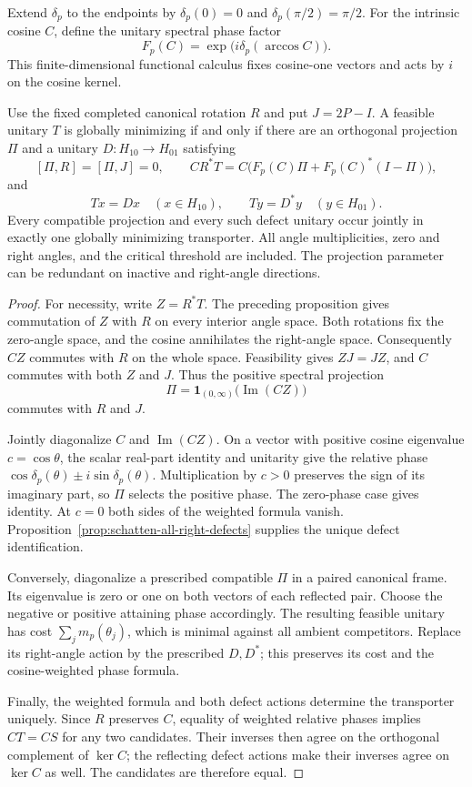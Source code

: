 Extend $\delta_p$ to the endpoints by
$\delta_p(0)=0$ and $\delta_p(\pi/2)=\pi/2$. For the intrinsic cosine
$C$, define the unitary spectral phase factor
\[
 F_p(C)=\exp\bigl(i\delta_p(\arccos C)\bigr).
\]
This finite-dimensional functional calculus fixes cosine-one vectors and
acts by $i$ on the cosine kernel.

\begin{theorem}
\label{thm:schatten-all-phase-defect-minimizers}
Use the fixed completed canonical rotation $R$ and put $J=2P-I$.
A feasible unitary $T$ is globally minimizing if and only if there are
an orthogonal projection $\Pi$ and a unitary
$D:H_{10}\to H_{01}$ satisfying
\[
 [\Pi,R]=[\Pi,J]=0,\qquad
 C R^*T=C\bigl(F_p(C)\Pi+F_p(C)^*(I-\Pi)\bigr),
\]
and
\[
 Tx=Dx\quad(x\in H_{10}),\qquad
 Ty=D^*y\quad(y\in H_{01}).
\]
Every compatible projection and every such defect unitary occur jointly
in exactly one globally minimizing transporter. All angle multiplicities,
zero and right angles, and the critical threshold are included.
The projection parameter can be redundant on inactive and right-angle
directions.
\end{theorem}

\begin{proof}
For necessity, write $Z=R^*T$. The preceding proposition gives commutation
of $Z$ with $R$ on every interior angle space. Both rotations fix the
zero-angle space, and the cosine annihilates the right-angle space.
Consequently $CZ$ commutes with $R$ on the whole space. Feasibility gives
$ZJ=JZ$, and $C$ commutes with both $Z$ and $J$.
Thus the positive spectral projection
\[
 \Pi=\mathbf1_{(0,\infty)}\bigl(\operatorname{Im}(CZ)\bigr)
\]
commutes with $R$ and $J$.

Jointly diagonalize $C$ and $\operatorname{Im}(CZ)$.
On a vector with positive cosine eigenvalue $c=\cos\theta$, the
scalar real-part identity and unitarity give the relative phase
$\cos\delta_p(\theta)\pm i\sin\delta_p(\theta)$.
Multiplication by $c>0$ preserves the sign of its imaginary part, so
$\Pi$ selects the positive phase. The zero-phase case gives identity.
At $c=0$ both sides of the weighted formula vanish.
Proposition~\ref{prop:schatten-all-right-defects} supplies the unique
defect identification.

Conversely, diagonalize a prescribed compatible $\Pi$ in a paired
canonical frame. Its eigenvalue is zero or one on both vectors of each
reflected pair. Choose the negative or positive attaining phase accordingly.
The resulting feasible unitary has cost $\sum_j m_p(\theta_j)$,
which is minimal against all ambient competitors. Replace its right-angle
action by the prescribed $D,D^*$; this preserves its cost and the
cosine-weighted phase formula.

Finally, the weighted formula and both defect actions determine the
transporter uniquely. Since $R$ preserves $C$, equality of weighted
relative phases implies $CT=CS$ for any two candidates. Their inverses
then agree on the orthogonal complement of $\ker C$; the reflecting
defect actions make their inverses agree on $\ker C$ as well.
The candidates are therefore equal.
\end{proof}

